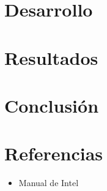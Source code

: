 \documentclass[10pt, a4paper]{article}
\begin{document}
\section{Desarrollo}
\section{Resultados}

\section{Conclusi\'on}
%

%

%

%

%

\section{Referencias}


\begin{itemize}
\item{Manual de Intel}

\end{itemize}
\end{document}
